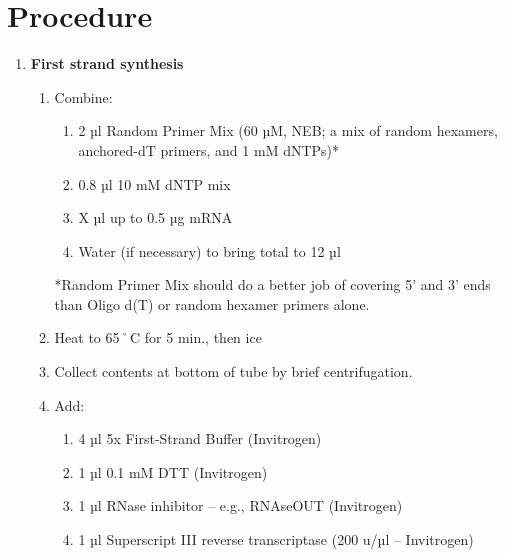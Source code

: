 \documentclass[
  letterpaper,
  DIV=11,
  numbers=noendperiod]{scrreprt}
\providecommand{\tightlist}{%
  \setlength{\itemsep}{0pt}\setlength{\parskip}{0pt}}\usepackage{longtable,booktabs,array}
\begin{document}
\hypertarget{procedure-12}{%
\section{Procedure}\label{procedure-12}}

\begin{enumerate}
\def\labelenumi{\arabic{enumi}.}
\item
  \textbf{First strand synthesis}

  \begin{enumerate}
  \def\labelenumii{\arabic{enumii}.}
  \item
    Combine:

    \begin{enumerate}
    \def\labelenumiii{\arabic{enumiii}.}
    \tightlist
    \item
      2 µl Random Primer Mix (60 µM, NEB; a mix of random hexamers,
      anchored-dT primers, and 1 mM dNTPs)*
    \item
      0.8 µl 10 mM dNTP mix
    \item
      X µl up to 0.5 µg mRNA
    \item
      Water (if necessary) to bring total to 12 µl
    \end{enumerate}

    \begin{tcolorbox}[enhanced jigsaw, rightrule=.15mm, title=\textcolor{quarto-callout-important-color}{\faExclamation}\hspace{0.5em}{NOTE}, titlerule=0mm, opacitybacktitle=0.6, toprule=.15mm, bottomrule=.15mm, opacityback=0, left=2mm, colframe=quarto-callout-important-color-frame, breakable, coltitle=black, colback=white, colbacktitle=quarto-callout-important-color!10!white, bottomtitle=1mm, leftrule=.75mm, toptitle=1mm, arc=.35mm]

    *Random Primer Mix should do a better job of covering 5' and 3' ends
    than Oligo d(T) or random hexamer primers alone.

    \end{tcolorbox}
  \item
    Heat to 65˚C for 5 min., then ice
  \item
    Collect contents at bottom of tube by brief centrifugation.
  \item
    Add:

    \begin{enumerate}
    \def\labelenumiii{\arabic{enumiii}.}
    \tightlist
    \item
      4 µl 5x First-Strand Buffer (Invitrogen)
    \item
      1 µl 0.1 mM DTT (Invitrogen)
    \item
      1 µl RNase inhibitor -- e.g., RNAseOUT (Invitrogen)
    \item
      1 µl Superscript III reverse transcriptase (200 u/µl --
      Invitrogen)
    \end{enumerate}


\end{enumerate}
\end{enumerate}
\end{document}
